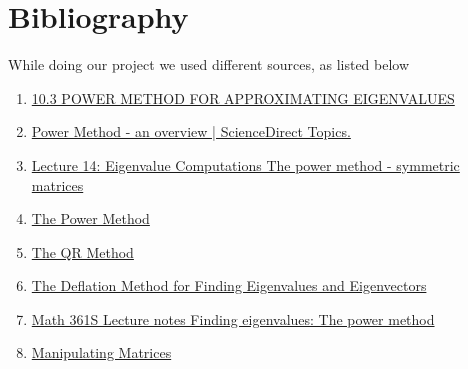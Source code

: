 \documentclass[11pt]{article}
\begin{document}
\section{Bibliography}
While doing our project we used different sources, as listed below 
\begin{enumerate}
    \item \href{https://ergodic.ugr.es/cphys/lecciones/fortran/power_method.pdf}{10.3 POWER METHOD FOR APPROXIMATING EIGENVALUES}
    
    \item \href {https://www.sciencedirect.com/topics/mathematics/power-method#:~:text=%E2%80%A2-,The%20Power%20Method%20is%20used%20to%20find%20a%20dominant%20eigenvalue,exists%2C%20and%20a%20corresponding%20eigenvector.&text=%E2%80%A2-,To%20apply%20the%20Power%20Method%20to%20a%20square%20matrix%20A,eigenvector%20of%20the%20dominant%20eigenvalue}{Power Method - an overview | ScienceDirect Topics.}
    
    \item \href{https://www.math.kent.edu/~reichel/courses/intr.num.comp.2/lecture21/evmeth.pdf}{Lecture 14: Eigenvalue Computations The power method - symmetric matrices}

    \item \href{https://pythonnumericalmethods.berkeley.edu/notebooks/chapter15.02-The-Power-Method.html}{The Power Method}

    \item \href{https://pythonnumericalmethods.berkeley.edu/notebooks/chapter15.03-The-QR-Method.html}{The QR Method}

    \item \href{https://astarmathsandphysics.com/university-maths-notes/matrices-and-linear-algebra/4554-the-deflation-method-for-finding-eigenvalues-and-eigenvectors.html}{The Deflation Method for Finding Eigenvalues and Eigenvectors}

    \item \href{https://services.math.duke.edu/~jtwong/math361-2019/lectures/Lec10eigenvalues.pdf}{Math 361S Lecture notes Finding eigenvalues: The power method}

    \item \href{https://www.geeksforgeeks.org/manipulating-matrices-in-julia/}{Manipulating Matrices}
    
    
\end{enumerate}
\end{document}
